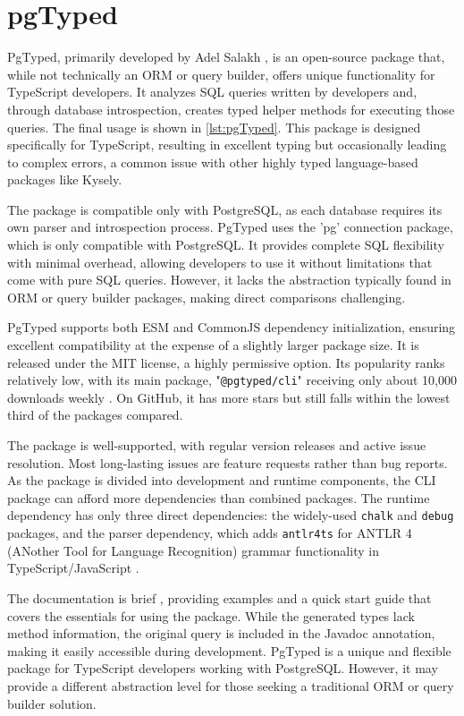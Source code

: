 \section{pgTyped}
PgTyped, primarily developed by Adel Salakh \cite{pgTyped}, is an open-source
package that, while not technically an ORM or query builder, offers unique
functionality for TypeScript developers. It analyzes SQL queries written by
developers and, through database introspection, creates typed helper methods for
executing those queries. The final usage is shown in \autoref{lst:pgTyped}. This
package is designed specifically for TypeScript, resulting in excellent typing
but occasionally leading to complex errors, a common issue with other highly
typed language-based packages like Kysely.

The package is compatible only with PostgreSQL, as each database requires its
own parser and introspection process. PgTyped uses the 'pg' connection package,
which is only compatible with PostgreSQL. It provides complete SQL flexibility
with minimal overhead, allowing developers to use it without limitations that
come with pure SQL queries. However, it lacks the abstraction typically found in
ORM or query builder packages, making direct comparisons challenging.

PgTyped supports both ESM and CommonJS dependency initialization, ensuring
excellent compatibility at the expense of a slightly larger package size. It is
released under the MIT license, a highly permissive option. Its popularity ranks
relatively low, with its main package, "\texttt{@pgtyped/cli}" receiving only
about 10,000 downloads weekly \cite{pgtyped/cli}. On GitHub, it has more stars
but still falls within the lowest third of the packages compared.

The package is well-supported, with regular version releases and active issue
resolution. Most long-lasting issues are feature requests rather than bug
reports. As the package is divided into development and runtime components, the
CLI package can afford more dependencies than combined packages. The runtime
dependency has only three direct dependencies: the widely-used \texttt{chalk}
and \texttt{debug} packages, and the parser dependency, which adds
\texttt{antlr4ts} for ANTLR 4 (ANother Tool for Language Recognition) grammar
functionality in TypeScript/JavaScript \cite{pgtyped/runtime}.

The documentation is brief \cite{pgtyped-docs}, providing examples and a quick
start guide that covers the essentials for using the package. While the
generated types lack method information, the original query is included in the
Javadoc annotation, making it easily accessible during development. PgTyped is a
unique and flexible package for TypeScript developers working with PostgreSQL.
However, it may provide a different abstraction level for those seeking a
traditional ORM or query builder solution.

